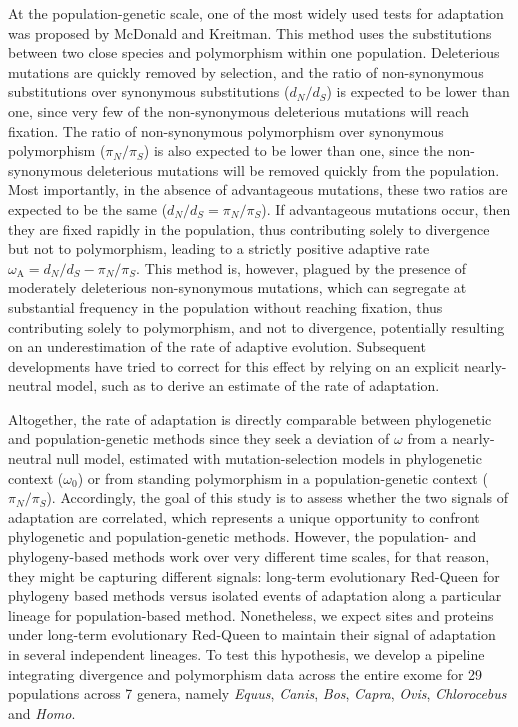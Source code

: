 \documentclass{article}
\newcommand{\dn}{d_N}
\newcommand{\ds}{d_S}
\newcommand{\dnds}{\dn / \ds}
\newcommand{\pn}{\pi_N}
\newcommand{\ps}{\pi_S}
\newcommand{\pnps}{\pn / \ps}
\begin{document}
    At the population-genetic scale, one of the most widely used tests for adaptation was proposed by McDonald and Kreitman\cite{mcdonald_adaptative_1991}.
    This method uses the substitutions between two close species and polymorphism within one population.
    Deleterious mutations are quickly removed by selection, and the ratio of non-synonymous substitutions over synonymous substitutions ($\dnds$) is expected to be lower than one, since very few of the non-synonymous deleterious mutations will reach fixation.
    The ratio of non-synonymous polymorphism over synonymous polymorphism ($\pnps$) is also expected to be lower than one, since the non-synonymous deleterious mutations will be removed quickly from the population.
    Most importantly, in the absence of advantageous mutations, these two ratios are expected to be the same ($\dnds=\pnps$).
    If advantageous mutations occur, then they are fixed rapidly in the population, thus contributing solely to divergence but not to polymorphism, leading to a strictly positive adaptive rate $\omega_{\mathrm{A}} = \dnds-\pnps$\cite{smith_adaptive_2002}.
    This method is, however, plagued by the presence of moderately deleterious non-synonymous mutations, which can segregate at substantial frequency in the population without reaching fixation, thus contributing solely to polymorphism, and not to divergence, potentially resulting on an underestimation of the rate of adaptive evolution\cite{eyre-walker_quantifying_2002}.
    Subsequent developments have tried to correct for this effect by relying on an explicit nearly-neutral model, such as to derive an estimate of the rate of adaptation\cite{eyre-walker_estimating_2009, galtier_adaptive_2016}.

    Altogether, the rate of adaptation is directly comparable between phylogenetic and population-genetic methods since they seek a deviation of $\omega$ from a nearly-neutral null model, estimated with mutation-selection models in phylogenetic context ($\omega_{0}$) or from standing polymorphism in a population-genetic context ($\pnps$).
    Accordingly, the goal of this study is to assess whether the two signals of adaptation are correlated, which represents a unique opportunity to confront phylogenetic and population-genetic methods.
    However, the population- and phylogeny-based methods work over very different time scales, for that reason, they might be capturing different signals: long-term evolutionary Red-Queen for phylogeny based methods versus isolated events of adaptation along a particular lineage for population-based method.
    Nonetheless, we expect sites and proteins under long-term evolutionary Red-Queen to maintain their signal of adaptation in several independent lineages.
    To test this hypothesis, we develop a pipeline integrating divergence and polymorphism data across the entire exome for 29 populations across 7 genera, namely \textit{Equus}, \textit{Canis}, \textit{Bos}, \textit{Capra}, \textit{Ovis}, \textit{Chlorocebus} and \textit{Homo}.
\end{document}
